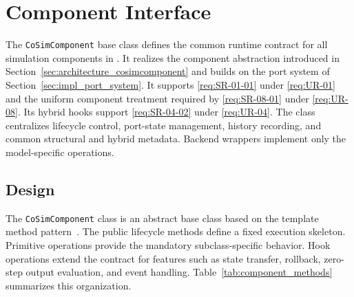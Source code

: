 \section{Component Interface}
\label{sec:impl_component_interface}

The \texttt{CoSimComponent} base class defines the common runtime contract for all simulation components in \syssimx{}.
It realizes the component abstraction introduced in Section~\ref{sec:architecture_cosimcomponent} and builds on the port system of Section~\ref{sec:impl_port_system}.
It supports \ref{req:SR-01-01} under \ref{req:UR-01} and the uniform component treatment required by \ref{req:SR-08-01} under \ref{req:UR-08}.
Its hybrid hooks support \ref{req:SR-04-02} under \ref{req:UR-04}.
The class centralizes lifecycle control, port-state management, history recording, and common structural and hybrid metadata.
Backend wrappers implement only the model-specific operations.

\subsection{Design}

The \texttt{CoSimComponent} class is an abstract base class based on the template method pattern~\cite{gamma_design_1995}.
The public lifecycle methods define a fixed execution skeleton.
Primitive operations provide the mandatory subclass-specific behavior.
Hook operations extend the contract for features such as state transfer, rollback, zero-step output evaluation, and event handling.
Table~\ref{tab:component_methods} summarizes this organization.

